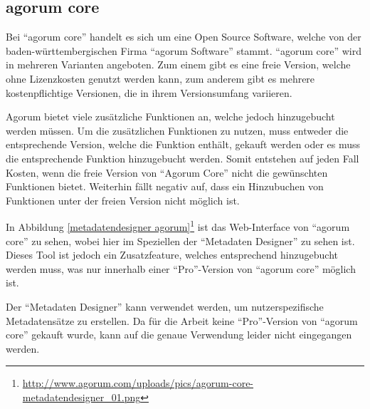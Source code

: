
\subsection{agorum core} \label{Agorum Core}
Bei "`agorum core"' handelt es sich um eine Open Source Software, welche von der baden-w\"urttembergischen Firma "`agorum Software"' stammt. "`agorum core"' wird in mehreren Varianten angeboten. Zum einem gibt es eine freie Version, welche ohne Lizenzkosten genutzt werden kann, zum anderem gibt es mehrere kostenpflichtige Versionen, die in ihrem Versionsumfang variieren. \cite{agorum_home} 

Agorum bietet viele zus\"atzliche Funktionen an, welche jedoch hinzugebucht werden m\"ussen. Um die zus\"atzlichen Funktionen zu nutzen, muss entweder die entsprechende Version, welche die Funktion enth\"alt, gekauft werden oder es muss die entsprechende Funktion hinzugebucht werden.
Somit entstehen auf jeden Fall Kosten, wenn die freie Version von "`Agorum Core"' nicht die gew\"unschten Funktionen bietet. Weiterhin f\"allt negativ auf, dass ein Hinzubuchen von Funktionen unter der freien Version nicht m\"oglich ist. \cite{agorum_preise} \cite{Eval_DMS_Bachelor}

In Abbildung \ref{metadatendesigner agorum}\footnote{\url{http://www.agorum.com/uploads/pics/agorum-core-metadatendesigner_01.png}} ist das Web-Interface von "`agorum core"' zu sehen, wobei hier im Speziellen der "`Metadaten Designer"' zu sehen ist. Dieses Tool ist jedoch ein Zusatzfeature, welches entsprechend hinzugebucht werden muss, was nur innerhalb einer "`Pro"'-Version von "`agorum core"' m\"oglich ist. \cite{agorum_metadesigner_bild}

Der "`Metadaten Designer"' kann verwendet werden, um nutzerspezifische Metadatens\"atze zu erstellen.  Da f\"ur die Arbeit keine "`Pro"'-Version von "`agorum core"' gekauft wurde, kann auf die genaue Verwendung leider nicht eingegangen werden. \cite{agorum_metadaten_designer_video}


